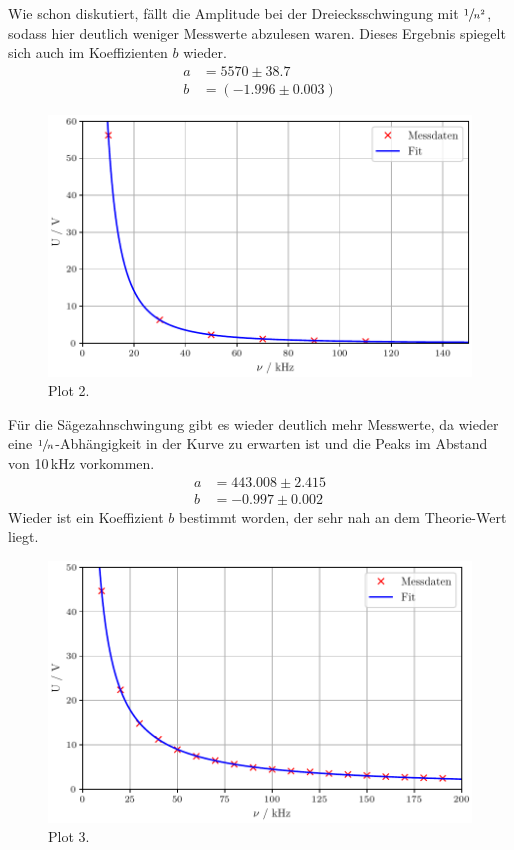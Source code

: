 Wie schon diskutiert, fällt die Amplitude bei der Dreiecksschwingung mit $\sfrac{1}{n^2}$, sodass hier deutlich weniger Messwerte
abzulesen waren. Dieses Ergebnis spiegelt sich auch im Koeffizienten $b$ wieder.
\begin{align*}
  a &= \si{5570 ± 38.7}\\
  b &= (-1.996 ± 0.003)
\end{align*}
\begin{figure}[H]
  \centering
  \includegraphics[scale=0.6]{plotb.pdf}
  \caption{Plot 2.}
  \label{fig:Plot2}
\end{figure}\noindent
Für die Sägezahnschwingung gibt es wieder deutlich mehr Messwerte, da wieder eine $\sfrac{1}{n}$-Abhängigkeit in der Kurve zu erwarten
ist und die Peaks im Abstand von 10\,kHz vorkommen.
\begin{align*}
  a &= \si{443.008 ± 2.415}\\
  b &= -0.997 ± 0.002
\end{align*} 
Wieder ist ein Koeffizient $b$ bestimmt worden, der sehr nah an dem Theorie-Wert liegt.
\begin{figure}[H]
  \centering
  \includegraphics[scale=0.6]{plotc.pdf} 
  \caption{Plot 3.}
  \label{fig:Plot3}
\end{figure} 